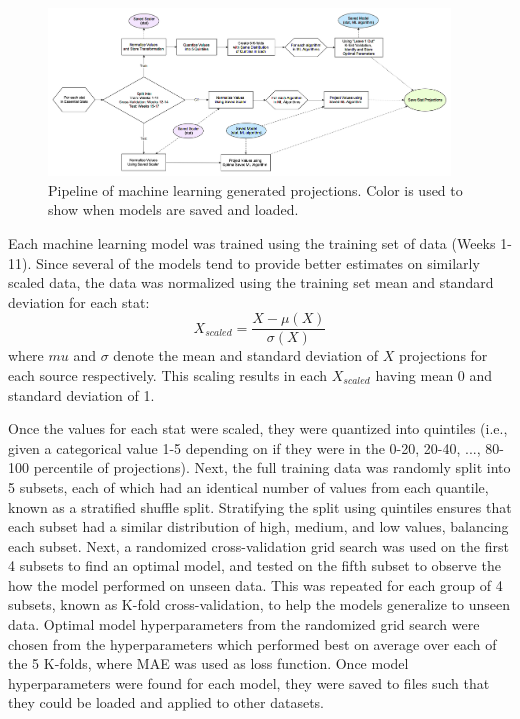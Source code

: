 \documentclass[12pt]{article}
\begin{document}
\begin{figure}[H]
  \centering
  \includegraphics[width=0.95\textwidth]{../figures/ML_flowchart}
  \caption{Pipeline of machine learning generated projections. Color is used to show when models are saved and loaded.}
  \label{ML pipeline}
\end{figure}

Each machine learning model was trained using the training set of data (Weeks 1-11). Since several of the models tend to provide better estimates on similarly scaled data, the data was normalized using the training set mean and standard deviation for each stat:
\begin{equation}
X_{scaled} = \dfrac{X - \mu (X)}{\sigma (X)}
\end{equation}
where $mu$ and $\sigma$ denote the mean and standard deviation of $X$ projections for each source respectively. This scaling results in each $X_{scaled}$ having mean 0 and standard deviation of 1.\bigskip

Once the values for each stat were scaled, they were quantized into quintiles (i.e., given a categorical value 1-5 depending on if they were in the 0-20, 20-40, ..., 80-100 percentile of projections). Next, the full training data was randomly split into 5 subsets, each of which had an identical number of values from each quantile, known as a stratified shuffle split. Stratifying the split using quintiles ensures that each subset had a similar distribution of high, medium, and low values, balancing each subset. Next, a randomized cross-validation grid search was used on the first 4 subsets to find an optimal model, and tested on the fifth subset to observe the how the model performed on unseen data. This was repeated for each group of 4 subsets, known as K-fold cross-validation, to help the models generalize to unseen data. Optimal model hyperparameters from the randomized grid search were chosen from the hyperparameters which performed best on average over each of the 5 K-folds, where MAE was used as loss function. Once model hyperparameters were found for each model, they were saved to files such that they could be loaded and applied to other datasets.\bigskip
\end{document}
